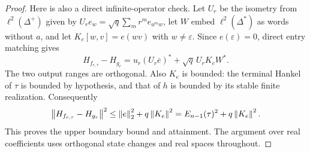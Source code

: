 \begin{proof}
Here is also a direct infinite-operator check.  Let $U_r$ be the
isometry from $\ell^2(\Delta^+)$ given by
$U_re_w=\sqrt q\sum_mr^m e_{a^m w}$, let $W$ embed
$\ell^2(\Delta^*)$ as words without $a$, and let
$K_e[w,v]=e(wv)$ with $w\ne\varepsilon$.  Since
$e(\varepsilon)=0$, direct entry matching gives
\begin{equation}
 H_{f_{r,\tau}}-H_{g_r}
   =u_r(U_r\overline e)^*+\sqrt q\,U_rK_eW^*.
 \label{I:R:eq:terminal-error-decomposition}
\end{equation}
The two output ranges are orthogonal.  Also $K_e$ is bounded: the
terminal Hankel of $\tau$ is bounded by hypothesis, and that of $h$ is
bounded by its stable finite realization.  Consequently
\[
 \left\lVert H_{f_{r,\tau}}-H_{g_r}\right\rVert^2
   \le\left\lVert e\right\rVert_2^2+q\left\lVert K_e\right\rVert^2
   =E_{n-1}(\tau)^2+q\left\lVert K_e\right\rVert^2.
\]
This proves the upper boundary bound and attainment.  The argument
over real coefficients uses orthogonal state changes and real spaces
throughout.
\end{proof}
